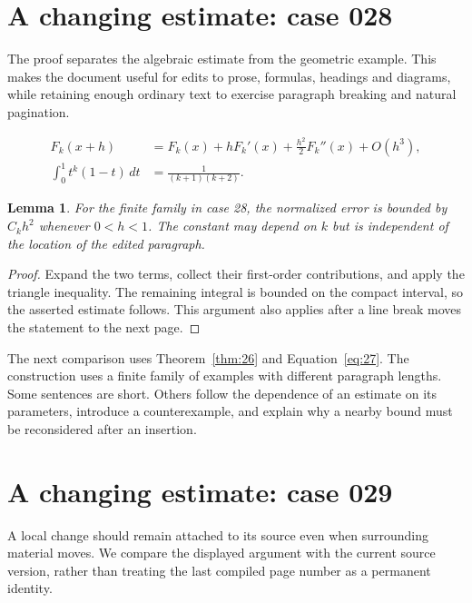 \documentclass[a4paper,10pt]{article}
\newtheorem{lemma}[theorem]{Lemma}
\begin{document}
\lipsum[8]

\section{A changing estimate: case 028}\label{unit:27}
The proof separates the algebraic estimate from the geometric example. This makes the document useful for edits to prose, formulas, headings and diagrams, while retaining enough ordinary text to exercise paragraph breaking and natural pagination.

\lipsum[22-23]
\begin{align}\label{eq:27}
 F_k(x+h)&=F_k(x)+hF_k'(x)+\frac{h^2}{2}F_k''(x)+O(h^3),\\
 \int_0^1 t^k(1-t)\,dt&=\frac{1}{(k+1)(k+2)}.
\end{align}
\begin{lemma}\label{thm:27}
For the finite family in case 28, the normalized error is bounded by $C_k h^2$ whenever $0<h<1$. The constant may depend on $k$ but is independent of the location of the edited paragraph.
\end{lemma}
\begin{proof}
Expand the two terms, collect their first-order contributions, and apply the
triangle inequality. The remaining integral is bounded on the compact interval,
so the asserted estimate follows. This argument also applies after a line break
moves the statement to the next page.
\end{proof}
\begin{center}
\end{center}
The next comparison uses Theorem~\ref{thm:26} and Equation~\ref{eq:27}. The construction uses a finite family of examples with different paragraph lengths. Some sentences are short. Others follow the dependence of an estimate on its parameters, introduce a counterexample, and explain why a nearby bound must be reconsidered after an insertion.

\lipsum[13]

\section{A changing estimate: case 029}\label{unit:28}
A local change should remain attached to its source even when surrounding material moves. We compare the displayed argument with the current source version, rather than treating the last compiled page number as a permanent identity.
\end{document}

